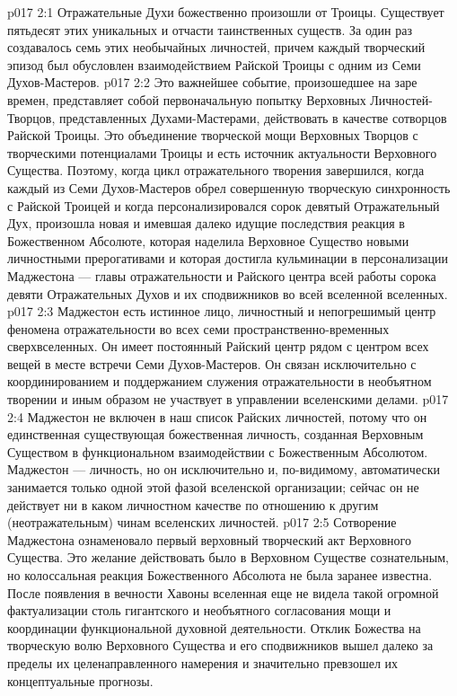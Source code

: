 \vs p017 2:1 Отражательные Духи божественно произошли от Троицы. Существует пятьдесят этих уникальных и отчасти таинственных существ. За один раз создавалось семь этих необычайных личностей, причем каждый творческий эпизод был обусловлен взаимодействием Райской Троицы с одним из Семи Духов\hyp{}Мастеров.
\vs p017 2:2 Это важнейшее событие, произошедшее на заре времен, представляет собой первоначальную попытку Верховных Личностей\hyp{}Творцов, представленных Духами\hyp{}Мастерами, действовать в качестве сотворцов Райской Троицы. Это объединение творческой мощи Верховных Творцов с творческими потенциалами Троицы и есть источник актуальности Верховного Существа. Поэтому, когда цикл отражательного творения завершился, когда каждый из Семи Духов\hyp{}Мастеров обрел совершенную творческую синхронность с Райской Троицей и когда персонализировался сорок девятый Отражательный Дух, произошла новая и имевшая далеко идущие последствия реакция в Божественном Абсолюте, которая наделила Верховное Существо новыми личностными прерогативами и которая достигла кульминации в персонализации Маджестона --- главы отражательности и Райского центра всей работы сорока девяти Отражательных Духов и их сподвижников во всей вселенной вселенных.
\vs p017 2:3 Маджестон есть истинное лицо, личностный и непогрешимый центр феномена отражательности во всех семи пространственно\hyp{}временных сверхвселенных. Он имеет постоянный Райский центр рядом с центром всех вещей в месте встречи Семи Духов\hyp{}Мастеров. Он связан исключительно с координированием и поддержанием служения отражательности в необъятном творении и иным образом не участвует в управлении вселенскими делами.
\vs p017 2:4 Маджестон не включен в наш список Райских личностей, потому что он единственная существующая божественная личность, созданная Верховным Существом в функциональном взаимодействии с Божественным Абсолютом. Маджестон --- личность, но он исключительно и, по\hyp{}видимому, автоматически занимается только одной этой фазой вселенской организации; сейчас он не действует ни в каком личностном качестве по отношению к другим (неотражательным) чинам вселенских личностей.
\vs p017 2:5 \pc Сотворение Маджестона ознаменовало первый верховный творческий акт Верховного Существа. Это желание действовать было в Верховном Существе сознательным, но колоссальная реакция Божественного Абсолюта не была заранее известна. После появления в вечности Хавоны вселенная еще не видела такой огромной фактуализации столь гигантского и необъятного согласования мощи и координации функциональной духовной деятельности. Отклик Божества на творческую волю Верховного Существа и его сподвижников вышел далеко за пределы их целенаправленного намерения и значительно превзошел их концептуальные прогнозы.
